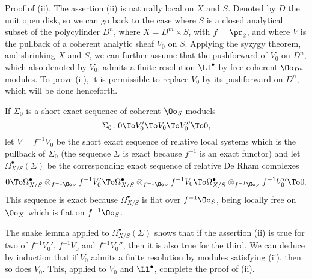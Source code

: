 \begin{subpara}
  Proof of (ii).
  The assertion (ii) is naturally local on $X$ and $S$. Denoted by $D$ the unit
  open disk, so we can go back to the case where $S$ is a closed analytical
  subset of the polycylinder $D^n$, where $X=D^m\times S$, with $f=\pr_2$, and
  where $V$ is the pullback of a coherent analytic sheaf $V_0$ on $S$.
  Applying the syzygy theorem, and shrinking $X$ and $S$, we can further assume
  that the pushforward of $V_0$ on $D^n$, which also denoted by $V_0$, admits a
  finite resolution $\Ll^\bullet$ by free coherent $\Oo_{D^n}$-modules.
  To prove (ii), it is permissible to replace $V_0$ by its pushforward on $D^n$,
  which will be done henceforth.

  If $\Sigma_0$ is a short exact sequence of coherent $\Oo_S$-moduels
  \[
  \Sigma_0\colon
  0\To V_0'\To V_0\To V_0''\To 0,
  \]
  let $V=f^{-1}V_0$ be the short exact sequence of relative local systems which
  is the pullback of $\Sigma_0$ (the sequence $\Sigma$ is exact because $f^{-1}$
  is an exact functor) and let $\Omega_{X/S}^\bullet(\Sigma)$ be the
  corresponding exact sequence of relative De Rham complexes
  \[
  0\To \Omega_{X/S}^\bullet\otimes_{f^{-1}\Oo_S}f^{-1}V_0'
  \To \Omega_{X/S}^\bullet\otimes_{f^{-1}\Oo_S}f^{-1}V_0
  \To \Omega_{X/S}^\bullet\otimes_{f^{-1}\Oo_S}f^{-1}V_0''\To 0.
  \]
  This sequence is exact because $\Omega_{X/S}^\bullet$ is flat over
  $f^{-1}\Oo_S$, being locally free on $\Oo_X$ which is flat on $f^{-1}\Oo_S$.

  The snake lemma applied to $\Omega_{X/S}^\bullet(\Sigma)$ shows that if the
  assertion (ii) is true for two of $f^{-1}V_0'$, $f^{-1}V_0$ and $f^{-1}V_0''$,
  then it is also true for the third. We can deduce by induction that if $V_0$
  admits a finite resolution by modules satisfying (ii), then so does $V_0$.
  This, applied to $V_0$ and $\Ll^\bullet$, complete the proof of (ii).
\end{subpara}
